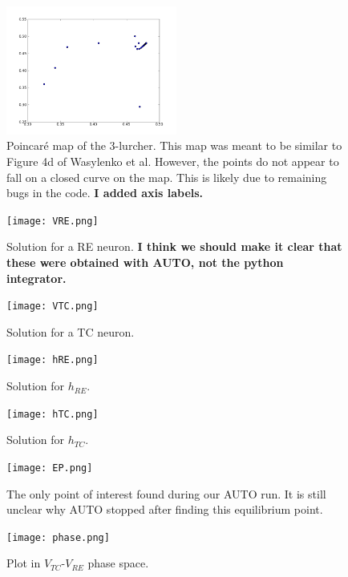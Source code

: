 \documentclass[12pt,letterpaper,oneside,openany]{article}
\begin{document}
\begin{figure}[t]
  \centering
  \includegraphics[width=0.5\textwidth]{4dNOPE.png}
  \caption{Poincar\'{e} map of the 3-lurcher. This map was meant to be similar to Figure 4d of Wasylenko et al. However, the points do not appear to fall on a closed curve on the map. This is likely due to remaining bugs in the code.
  \textbf{I added axis labels.}
  }
  \label{fig:4dNOPE}
\end{figure}

\begin{figure}[t]
  \centering
  \texttt{[image: VRE.png]}
  \caption{Solution for a RE neuron.
  \textbf{I think we should make it clear that these were obtained with AUTO, not the python integrator.}
  }
  \label{fig:VRE}
\end{figure}

\begin{figure}[t]
  \centering
  \texttt{[image: VTC.png]}
  \caption{Solution for a TC neuron.}
  \label{fig:VTC}
\end{figure}

\begin{figure}[t]
  \centering
  \texttt{[image: hRE.png]}
  \caption{Solution for $h_{RE}$.}
  \label{fig:hRE}
\end{figure}

\begin{figure}[t]
  \centering
  \texttt{[image: hTC.png]}
  \caption{Solution for $h_{TC}$.}
  \label{fig:hTC}
\end{figure}

\begin{figure}[t]
  \centering
  \texttt{[image: EP.png]}
  \caption{The only point of interest found during our AUTO run. It is still unclear why AUTO stopped after finding this equilibrium point.}
  \label{fig:EP}
\end{figure}

\begin{figure}[t]
  \centering
  \texttt{[image: phase.png]}
  \caption{Plot in $V_{TC}$-$V_{RE}$ phase space.}
  \label{fig:phase}
\end{figure}














\end{document}
